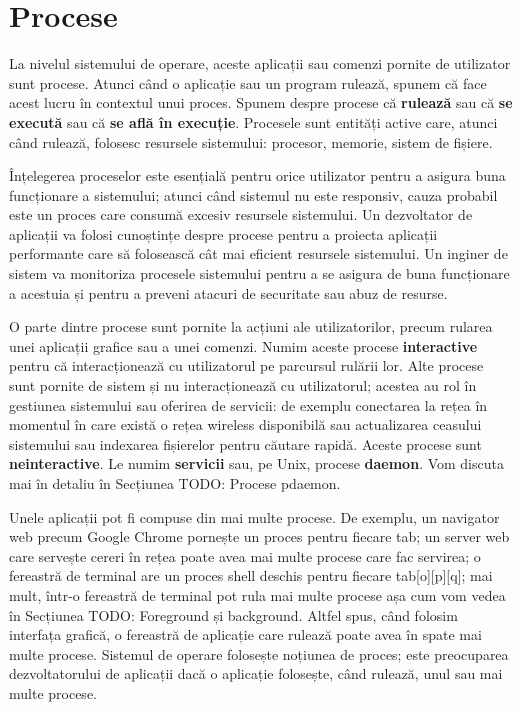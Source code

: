 \chapter{Procese}

La nivelul sistemului de operare, aceste aplicații sau comenzi pornite de
utilizator sunt procese.  Atunci când o aplicație sau un program rulează, spunem
că face acest lucru în contextul unui proces.  Spunem despre procese că
\textbf{rulează} sau că \textbf{se execută} sau că \textbf{se află în execuție}.
Procesele sunt entități active care, atunci când rulează, folosesc resursele
sistemului: procesor, memorie, sistem de fișiere.

Înțelegerea proceselor este esențială pentru orice utilizator pentru a asigura
buna funcționare a sistemului; atunci când sistemul nu este responsiv, cauza
probabil este un proces care consumă excesiv resursele sistemului. Un
dezvoltator de aplicații va folosi cunoștințe despre procese pentru a proiecta
aplicații performante care să folosească cât mai eficient resursele sistemului.
Un inginer de sistem va monitoriza procesele sistemului pentru a se asigura de
buna funcționare a acestuia și pentru a preveni atacuri de securitate sau abuz
de resurse.

O parte dintre procese sunt pornite la acțiuni ale utilizatorilor, precum
rularea unei aplicații grafice sau a unei comenzi. Numim aceste procese
\textbf{interactive} pentru că interacționează cu utilizatorul pe parcursul rulării lor.
Alte procese sunt pornite de sistem și nu interacționează cu utilizatorul;
acestea au rol în gestiunea sistemului sau oferirea de servicii: de exemplu
conectarea la rețea în momentul în care există o rețea wireless disponibilă sau
actualizarea ceasului sistemului sau indexarea fișierelor pentru căutare rapidă.
Aceste procese sunt \textbf{neinteractive}. Le numim \textbf{servicii} sau, pe Unix, procese
\textbf{daemon}. Vom discuta mai în detaliu în Secțiunea TODO: Procese pdaemon.

Unele aplicații pot fi compuse din mai multe procese. De exemplu, un navigator
web precum Google Chrome pornește un proces pentru fiecare tab; un server web
care servește cereri în rețea poate avea mai multe procese care fac servirea; o
fereastră de terminal are un proces shell deschis pentru fiecare tab[o][p][q];
mai mult, într-o fereastră de terminal pot rula mai multe procese așa cum vom
vedea în Secțiunea TODO: Foreground și background. Altfel spus, când folosim
interfața grafică, o fereastră de aplicație care rulează poate avea în spate mai
multe procese. Sistemul de operare folosește noțiunea de proces; este
preocuparea dezvoltatorului de aplicații dacă o aplicație folosește, când
rulează, unul sau mai multe procese.

